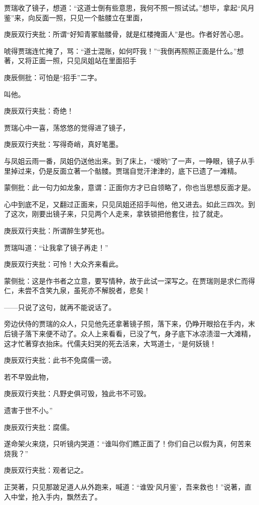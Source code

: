 \begin{parag}
    贾瑞收了镜子，想道：“这道士倒有些意思，我何不照一照试试。”想毕，拿起“风月鉴”来，向反面一照，只见一个骷髅立在里面，\begin{note}庚辰双行夹批：所谓“好知青冢骷髅骨，就是红楼掩面人”是也。作者好苦心思。\end{note}唬得贾瑞连忙掩了，骂：“道士混账，如何吓我！”“我倒再照照正面是什么。”想著，又将正面一照，只见凤姐站在里面招手\begin{note}庚辰侧批：可怕是“招手”二字。\end{note}叫他。\begin{note}庚辰双行夹批：奇绝！\end{note}贾瑞心中一喜，荡悠悠的觉得进了镜子，\begin{note}庚辰双行夹批：写得奇峭，真好笔墨。\end{note}与凤姐云雨一番，凤姐仍送他出来。到了床上，“嗳哟”了一声，一睁眼，镜子从手里掉过来，仍是反面立著一个骷髅。贾瑞自觉汗津津的，底下已遗了一滩精。\begin{note}蒙侧批：此一句力如龙象，意谓：正面你方才已自领略了，你也当思想反面才是。\end{note}心中到底不足，又翻过正面来，只见凤姐还招手叫他，他又进去。如此三四次。到了这次，刚要出镜子来，只见两个人走来，拿铁锁把他套住，拉了就走。\begin{note}庚辰双行夹批：所谓醉生梦死也。\end{note}贾瑞叫道：“让我拿了镜子再走！”\begin{note}庚辰双行夹批：可怜！大众齐来看此。\end{note}\begin{note}蒙侧批：这是作书者之立意，要写情种，故于此试一深写之。在贾瑞则是求仁而得仁，未尝不含笑九泉，虽死亦不解脱者，悲矣！\end{note}——只说了这句，就再不能说话了。
\end{parag}


\begin{parag}
    旁边伏侍的贾瑞的众人，只见他先还拿著镜子照，落下来，仍睁开眼拾在手内，末后镜子落下来便不动了。众人上来看看，已没了气，身子底下冰凉渍湿一大滩精，这才忙著穿衣抬床。代儒夫妇哭的死去活来，大骂道士，“是何妖镜！\begin{note}庚辰双行夹批：此书不免腐儒一谤。\end{note}若不早毁此物，\begin{note}庚辰双行夹批：凡野史俱可毁，独此书不可毁。\end{note}遗害于世不小。”\begin{note}庚辰双行夹批：腐儒。\end{note}遂命架火来烧，只听镜内哭道：“谁叫你们瞧正面了！你们自己以假为真，何苦来烧我？”\begin{note}庚辰双行夹批：观者记之。\end{note}正哭著，只见那跛足道人从外跑来，喊道：“谁毁‘风月鉴’，吾来救也！”说著，直入中堂，抢入手内，飘然去了。
\end{parag}


